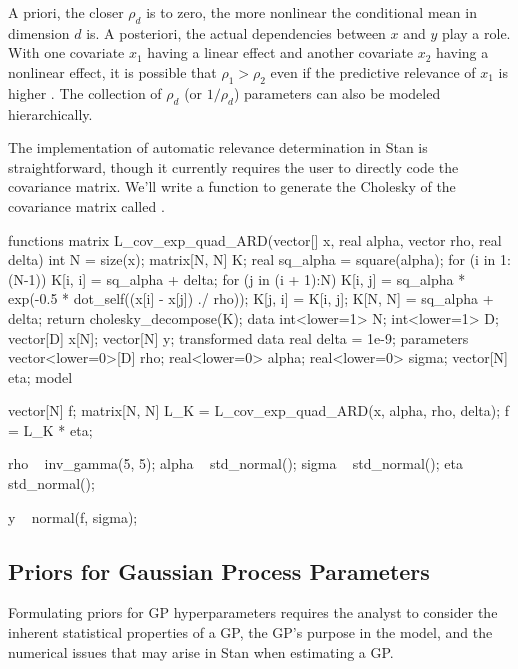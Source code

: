 A priori, the closer $\rho_d$ is to zero, the more nonlinear the
conditional mean in dimension $d$ is.  A posteriori, the actual dependencies
between $x$ and $y$ play a role.  With one covariate $x_1$ having a
linear effect and another covariate $x_2$ having a nonlinear effect,
it is possible that $\rho_1 > \rho_2$ even if the predictive relevance
of $x_1$ is higher \cite[page~80]{RasmussenWilliams:2006}.
The collection of $\rho_d$ (or $1/\rho_d$) parameters can also be
modeled hierarchically.

The implementation of automatic relevance determination in Stan is
straightforward, though it currently requires the user to directly code the
covariance matrix. We'll write a function to generate the Cholesky of the
covariance matrix called .

%
\begin{stancode}
functions {
  matrix L_cov_exp_quad_ARD(vector[] x,
                            real alpha,
                            vector rho,
                            real delta) {
    int N = size(x);
    matrix[N, N] K;
    real sq_alpha = square(alpha);
    for (i in 1:(N-1)) {
      K[i, i] = sq_alpha + delta;
      for (j in (i + 1):N) {
        K[i, j] = sq_alpha
                      * exp(-0.5 * dot_self((x[i] - x[j]) ./ rho));
        K[j, i] = K[i, j];
      }
    }
    K[N, N] = sq_alpha + delta;
    return cholesky_decompose(K);
  }
}
data {
  int<lower=1> N;
  int<lower=1> D;
  vector[D] x[N];
  vector[N] y;
}
transformed data {
  real delta = 1e-9;
}
parameters {
  vector<lower=0>[D] rho;
  real<lower=0> alpha;
  real<lower=0> sigma;
  vector[N] eta;
}
model {
  vector[N] f;
  {
    matrix[N, N] L_K = L_cov_exp_quad_ARD(x, alpha, rho, delta);
    f = L_K * eta;
  }

  rho ~ inv_gamma(5, 5);
  alpha ~ std_normal();
  sigma ~ std_normal();
  eta ~ std_normal();

  y ~ normal(f, sigma);
}
\end{stancode}
%

\subsection{Priors for Gaussian Process Parameters}\label{priors-gp.section}

Formulating priors for GP hyperparameters requires the analyst to consider the
inherent statistical properties of a GP, the GP's purpose in the model, and the
numerical issues that may arise in Stan when estimating a GP.


